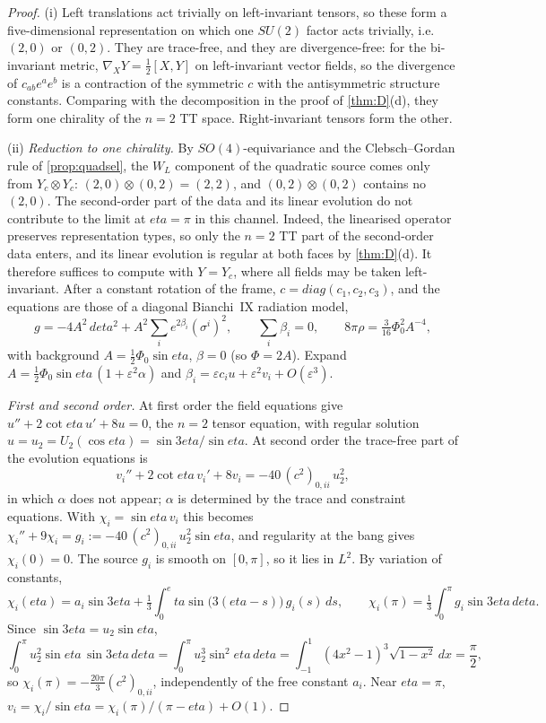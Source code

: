 \documentclass[11pt]{article}
\theoremstyle{canonmath}
\theoremstyle{canonpostulate}
\theoremstyle{canonproposition}
\theoremstyle{canonmath}
\theoremstyle{canonproposition}
\def\mathrm#1{#1}%
\def\eta{eta}%
\begin{document}
\begin{proof}
(i) Left translations act trivially on left-invariant tensors, so these form a five-dimensional representation on which one $SU(2)$ factor acts trivially, i.e.\ $(2,0)$ or $(0,2)$. They are trace-free, and they are divergence-free: for the bi-invariant metric, $\nabla_XY = \tfrac12[X,Y]$ on left-invariant vector fields, so the divergence of $c_{ab}e^ae^b$ is a contraction of the symmetric $c$ with the antisymmetric structure constants. Comparing with the decomposition in the proof of \cref{thm:D}(d), they form one chirality of the $n=2$ TT space. Right-invariant tensors form the other.

(ii) \emph{Reduction to one chirality.} By $SO(4)$-equivariance and the Clebsch--Gordan rule of \cref{prop:quadsel}, the $W_L$ component of the quadratic source comes only from $Y_c\otimes Y_c$: $(2,0)\otimes(0,2) = (2,2)$, and $(0,2)\otimes(0,2)$ contains no $(2,0)$. The second-order part of the data and its linear evolution do not contribute to the limit at $\eta = \pi$ in this channel. Indeed, the linearised operator preserves representation types, so only the $n=2$ TT part of the second-order data enters, and its linear evolution is regular at both faces by \cref{thm:D}(d). It therefore suffices to compute with $Y = Y_c$, where all fields may be taken left-invariant. After a constant rotation of the frame, $c = \mathrm{diag}(c_1,c_2,c_3)$, and the equations are those of a diagonal Bianchi~IX radiation model,
\[
g = -4A^2\,d\eta^2 + A^2\sum_ie^{2\beta_i}(\sigma^i)^2, \qquad \sum_i\beta_i = 0, \qquad 8\pi\rho = \tfrac{3}{16}\Phi_0^2A^{-4},
\]
with background $A = \tfrac12\Phi_0\sin\eta$, $\beta = 0$ (so $\Phi = 2A$). Expand $A = \tfrac12\Phi_0\sin\eta\,(1+\varepsilon^2\alpha)$ and $\beta_i = \varepsilon c_iu + \varepsilon^2v_i + O(\varepsilon^3)$.

\emph{First and second order.} At first order the field equations give $u'' + 2\cot\eta\,u' + 8u = 0$, the $n=2$ tensor equation, with regular solution $u = u_2 = U_2(\cos\eta) = \sin3\eta/\sin\eta$. At second order the trace-free part of the evolution equations is
\[
v_i'' + 2\cot\eta\,v_i' + 8v_i = -40\,(c^2)_{0,ii}\,u_2^2,
\]
in which $\alpha$ does not appear; $\alpha$ is determined by the trace and constraint equations. With $\chi_i = \sin\eta\,v_i$ this becomes $\chi_i'' + 9\chi_i = g_i := -40\,(c^2)_{0,ii}\,u_2^2\sin\eta$, and regularity at the bang gives $\chi_i(0) = 0$. The source $g_i$ is smooth on $[0,\pi]$, so it lies in $L^2$. By variation of constants,
\[
\chi_i(\eta) = a_i\sin3\eta + \tfrac13\int_0^\eta\sin\bigl(3(\eta-s)\bigr)\,g_i(s)\,ds,
\qquad
\chi_i(\pi) = \tfrac13\int_0^\pi g_i\sin3\eta\,d\eta .
\]
Since $\sin3\eta = u_2\sin\eta$,
\[
\int_0^\pi u_2^2\sin\eta\,\sin3\eta\,d\eta = \int_0^\pi u_2^3\sin^2\eta\,d\eta = \int_{-1}^1(4x^2-1)^3\sqrt{1-x^2}\,dx = \frac\pi2,
\]
so $\chi_i(\pi) = -\tfrac{20\pi}{3}(c^2)_{0,ii}$, independently of the free constant $a_i$. Near $\eta = \pi$, $v_i = \chi_i/\sin\eta = \chi_i(\pi)/(\pi-\eta) + O(1)$.


\end{proof}
\end{document}
